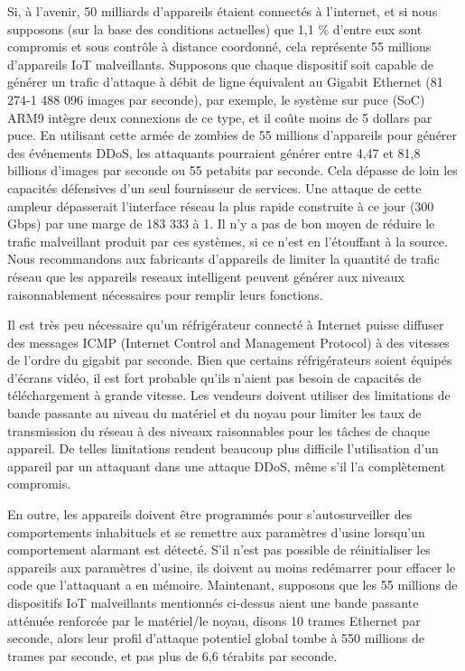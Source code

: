 \documentclass[12pt]{report}
\begin{document}
Si, à l'avenir, 50 milliards d'appareils étaient connectés à l'internet, et si nous supposons (sur la base des conditions
actuelles) que 1,1 \% d'entre eux sont compromis et sous contrôle à
distance coordonné, cela représente 55 millions d'appareils IoT
malveillants. Supposons que chaque dispositif soit capable de générer un
trafic d'attaque à débit de ligne équivalent au Gigabit Ethernet (81
274-1 488 096 images par seconde), par exemple, le système sur puce
(SoC) ARM9 intègre deux connexions de ce type, et il coûte moins de 5
dollars par puce. En utilisant cette armée de zombies de 55 millions
d'appareils pour générer des événements DDoS, les attaquants pourraient
générer entre 4,47 et 81,8 billions d'images par seconde ou 55 petabits
par seconde. Cela dépasse de loin les capacités défensives d'un seul
fournisseur de services. Une attaque de cette ampleur dépasserait
l'interface réseau la plus rapide construite à ce jour (300 Gbps) par
une marge de 183 333 à 1. Il n'y a pas de bon moyen de réduire le trafic
malveillant produit par ces systèmes, si ce n'est en l'étouffant à la
source. Nous recommandons aux fabricants d'appareils de limiter la
quantité de trafic réseau que les appareils reseaux intelligent peuvent générer aux
niveaux raisonnablement nécessaires pour remplir leurs fonctions.

Il est très peu nécessaire qu'un réfrigérateur connecté à Internet puisse
diffuser des messages ICMP (Internet Control and Management Protocol) à
des vitesses de l'ordre du gigabit par seconde. Bien que certains
réfrigérateurs soient équipés d'écrans vidéo, il est fort probable
qu'ils n'aient pas besoin de capacités de téléchargement à grande
vitesse. Les vendeurs doivent utiliser des limitations de bande passante
au niveau du matériel et du noyau pour limiter les taux de transmission
du réseau à des niveaux raisonnables pour les tâches de chaque appareil.
De telles limitations rendent beaucoup plus difficile l'utilisation d'un
appareil par un attaquant dans une attaque DDoS, même s'il l'a
complètement compromis.

En outre, les appareils doivent être programmés pour s'autosurveiller des comportements inhabituels et se remettre aux
paramètres d'usine lorsqu'un comportement alarmant est détecté. S'il
n'est pas possible de réinitialiser les appareils aux paramètres
d'usine, ils doivent au moins redémarrer pour effacer le code que
l'attaquant a en mémoire. Maintenant, supposons que les 55 millions de
dispositifs IoT malveillants mentionnés ci-dessus aient une bande
passante atténuée renforcée par le matériel/le noyau, disons 10 trames
Ethernet par seconde, alors leur profil d'attaque potentiel global tombe
à 550 millions de trames par seconde, et pas plus de 6,6 térabits par
seconde.
\end{document}
